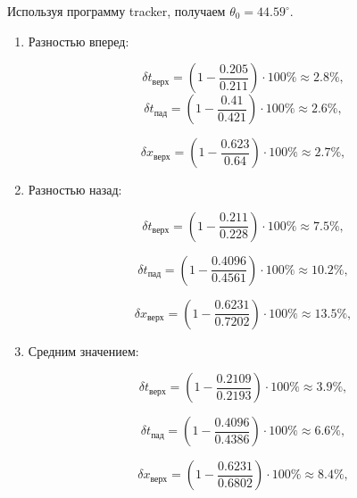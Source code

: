 \documentclass{report}
\begin{document}
Используя программу tracker, получаем $\theta_0=44.59^{\circ}$.

\begin{enumerate}
\item
Разностью вперед:

\begin{equation}
  \delta t_{\text{верх}} = (1 - \dfrac{0.205}{0.211}) \cdot 100 \% \approx 2.8\% \text{,}
\end{equation}
\begin{equation}
  \delta t_{\text{пад}} = (1 - \dfrac{0.41}{0.421}) \cdot 100 \% \approx 2.6\% \text{,}
\end{equation}

\begin{equation}
  \delta x_{\text{верх}} = (1 - \dfrac{0.623}{0.64}) \cdot 100 \% \approx 2.7\% \text{,} 
\end{equation}

\item Разностью назад:


\begin{equation}
  \delta t_{\text{верх}} = (1 - \dfrac{0.211}{0.228}) \cdot 100 \% \approx 7.5\% \text{,}
\end{equation}

\begin{equation}
  \delta t_{\text{пад}} = (1 - \dfrac{0.4096}{0.4561}) \cdot 100 \% \approx 10.2\% \text{,}
\end{equation}

\begin{equation}
  \delta x_{\text{верх}} = (1 - \dfrac{0.6231}{0.7202}) \cdot 100 \% \approx 13.5\% \text{,}
\end{equation}


\item Средним значением:

\begin{equation}
  \delta t_{\text{верх}} = (1 - \dfrac{0.2109}{0.2193}) \cdot 100 \% \approx 3.9\% \text{,}
\end{equation}

\begin{equation}
  \delta t_{\text{пад}} = (1 - \dfrac{0.4096}{0.4386}) \cdot 100 \% \approx 6.6\% \text{,}
\end{equation}

\begin{equation}
  \delta x_{\text{верх}} = (1 - \dfrac{0.6231}{0.6802}) \cdot 100 \% \approx 8.4\% \text{,}
\end{equation}


\end{enumerate}
\end{document}
